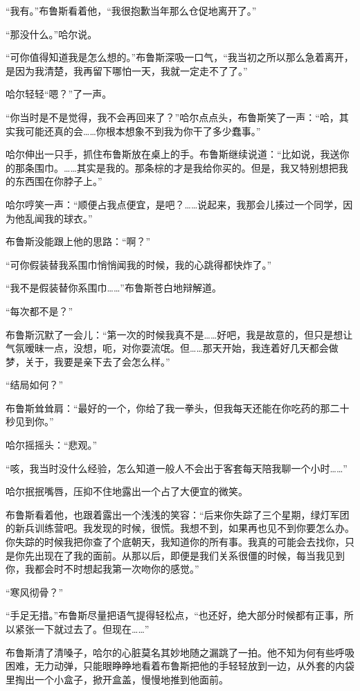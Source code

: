 \documentclass[../main]{subfiles}
\begin{document}
“我有。”布鲁斯看着他，“我很抱歉当年那么仓促地离开了。”

“那没什么。”哈尔说。

“可你值得知道我是怎么想的。”布鲁斯深吸一口气，“我当初之所以那么急着离开，是因为我清楚，我再留下哪怕一天，我就一定走不了了。”

哈尔轻轻“嗯？”了一声。

“你当时是不是觉得，我不会再回来了？”哈尔点点头，布鲁斯笑了一声：“哈，其实我可能还真的会……你根本想象不到我为你干了多少蠢事。”

哈尔伸出一只手，抓住布鲁斯放在桌上的手。布鲁斯继续说道：“比如说，我送你的那条围巾。……其实是我的。那条棕的才是我给你买的。但是，我又特别想把我的东西围在你脖子上。”

哈尔哼笑一声：“顺便占我点便宜，是吧？……说起来，我那会儿揍过一个同学，因为他乱闻我的球衣。”

布鲁斯没能跟上他的思路：“啊？”

“可你假装替我系围巾悄悄闻我的时候，我的心跳得都快炸了。”

“我不是假装替你系围巾……”布鲁斯苍白地辩解道。

“每次都不是？”

布鲁斯沉默了一会儿：“第一次的时候我真不是……好吧，我是故意的，但只是想让气氛暧昧一点，没想，呃，对你耍流氓。但……那天开始，我连着好几天都会做梦，关于，我要是亲下去了会怎么样。”

“结局如何？”

布鲁斯耸耸肩：“最好的一个，你给了我一拳头，但我每天还能在你吃药的那二十秒见到你。”

哈尔摇摇头：“悲观。”

“咳，我当时没什么经验，怎么知道一般人不会出于客套每天陪我聊一个小时……”

哈尔抿抿嘴唇，压抑不住地露出一个占了大便宜的微笑。

布鲁斯看着他，也跟着露出一个浅浅的笑容：“后来你失踪了三个星期，绿灯军团的新兵训练营吧。我发现的时候，很慌。我想不到，如果再也见不到你要怎么办。你失踪的时候我把你查了个底朝天，我知道你的所有事。我真的可能会去找你，只是你先出现在了我的面前。从那以后，即便是我们关系很僵的时候，每当我见到你，我都会时不时想起我第一次吻你的感觉。”

“寒风彻骨？”

“手足无措。”布鲁斯尽量把语气提得轻松点，“也还好，绝大部分时候都有正事，所以紧张一下就过去了。但现在……”

布鲁斯清了清嗓子，哈尔的心脏莫名其妙地随之漏跳了一拍。他不知为何有些呼吸困难，无力动弹，只能眼睁睁地看着布鲁斯把他的手轻轻放到一边，从外套的内袋里掏出一个小盒子，掀开盒盖，慢慢地推到他面前。
\end{document}
